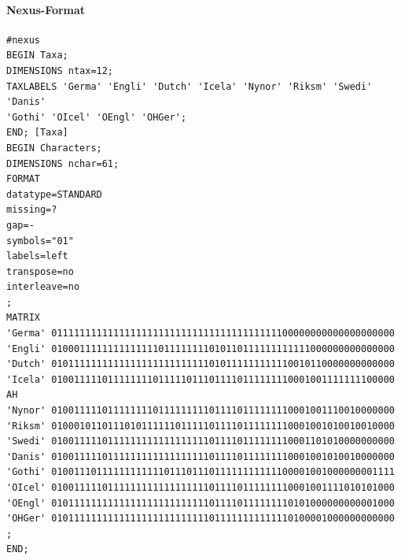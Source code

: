 \paragraph{Nexus-Format}

\begin{verbatim}
#nexus
BEGIN Taxa;
DIMENSIONS ntax=12;
TAXLABELS 'Germa' 'Engli' 'Dutch' 'Icela' 'Nynor' 'Riksm' 'Swedi' 'Danis'
'Gothi' 'OIcel' 'OEngl' 'OHGer';
END; [Taxa]
BEGIN Characters;
DIMENSIONS nchar=61;
FORMAT
datatype=STANDARD
missing=?
gap=-
symbols="01"
labels=left
transpose=no
interleave=no
;
MATRIX
'Germa' 0111111111111111111111111111111111111111100000000000000000000
'Engli' 0100011111111111111011111111010110111111111111000000000000000
'Dutch' 0101111111111111111111111111010111111111110010110000000000000
'Icela' 0100111110111111110111110111011110111111110001001111111100000
AH
'Nynor' 0100111110111111110111111111011110111111110001001110010000000
'Riksm' 0100010110111010111111011111011110111111110001001010010010000
'Swedi' 0100111110111111111111111111011110111111110001101010000000000
'Danis' 0100111110111111111111111111011110111111110001001010010000000
'Gothi' 0100111011111111111101110111011111111111100001001000000001111
'OIcel' 0100111110111111111111111111011110111111110001001111010101000
'OEngl' 0101111111111111111111111111011110111111110101000000000001000
'OHGer' 0101111111111111111111111111011111111111110100001000000000000
;
END;
\end{verbatim}

